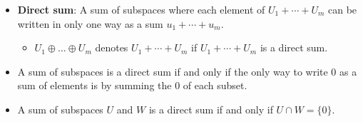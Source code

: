 \documentclass[titlepage]{article}
\numberwithin{figure}{section}
\begin{document}
\begin{itemize}
\begin{itemize}
    \end{itemize}
    \item \textbf{Direct sum}: A sum of subspaces where each element of $U_1+\cdots+U_m$ can be written in only one way as a sum $u_1+\cdots+u_m$.
    \begin{itemize}
        \item $U_1\oplus\dots\oplus U_m$ denotes $U_1+\cdots+U_m$ if $U_1+\cdots+U_m$ is a direct sum.
    \end{itemize}
    \item A sum of subspaces is a direct sum if and only if the only way to write $0$ as a sum of elements is by summing the $0$ of each subset.
    \item A sum of subspaces $U$ and $W$ is a direct sum if and only if $U\cap W=\{0\}$.
\end{itemize}
\newpage
\end{document}
